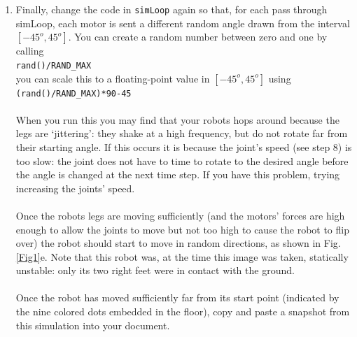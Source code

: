 \documentclass[12pt]{article}
\begin{document}
\begin{enumerate}
\item Finally, change the code in \texttt{simLoop} again so that, for each pass through simLoop, each motor is sent a different random angle drawn from the interval $[-45^o,45^o]$. You can create a random number between zero and one by calling \\
    \texttt{rand()/RAND\_MAX} \\
    you can scale this to a floating-point value in $[-45^o,45^o]$ using \\
    \texttt{(rand()/RAND\_MAX)*90-45} \\ \\
    When you run this you may find that your robots hops around because the legs are `jittering': they shake at a high frequency, but do not rotate far from their starting angle. If this occurs it is because the joint's speed (see step 8) is too slow: the joint does not have to time to rotate to the desired angle before the angle is changed at the next time step. If you have this problem, trying increasing the joints' speed. \\ \\
    Once the robots legs are moving sufficiently (and the motors' forces are high enough to allow the joints to move but not too high to cause the robot to flip over) the robot should start to move in random directions, as shown in Fig. \ref{Fig1}e. Note that this robot was, at the time this image was taken, statically unstable: only its two right feet were in contact with the ground. \\ \\
    Once the robot has moved sufficiently far from its start point (indicated by the nine colored dots embedded in the floor), copy and paste a snapshot from this simulation into your document.

\end{enumerate}
\end{document}
